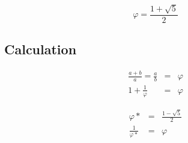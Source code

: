 \begin{equation}
    \varphi = \frac{1+\sqrt{5}}{2}
\end{equation}

\subsection{Calculation}
\begin{eqnarray}
    \frac{a+b}{a} = \frac{a}{b} &=& \varphi\\
    1 + \frac{1}{\varphi} &=& \varphi
\end{eqnarray}

\begin{eqnarray}
    \varphi* &=& \frac{1-\sqrt{5}}{2} \\
    \frac{1}{\varphi*} &=& \varphi
\end{eqnarray}
